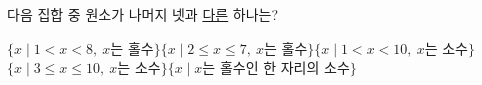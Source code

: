 다음 집합 중 원소가 나머지 넷과 \underline{다른} 하나는?
\begin{choicesv}{$\{x \mid 1<x<8,\ x$는 홀수$\}$}{$\{x \mid 2\le x\le 7,\ x$는 홀수$\}$}{$\{x \mid 1<x<10,\ x$는 소수$\}$}{$\{x \mid 3\le x\le 10,\ x$는 소수$\}$}{$\{x \mid x$는 홀수인 한 자리의 소수$\}$}\end{choicesv}
